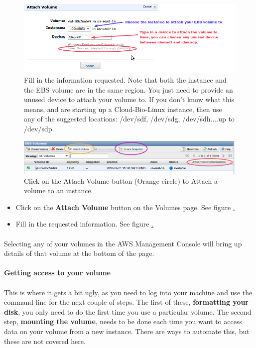 \begin{figure}[!hd]
\includegraphics[width=\maxwidth]{"images/attachVolume-2"}
\caption[Attaching a volume]{\label{fig:attachvolume1}Fill in the information requested. Note that both the instance and the EBS volume are in the same region. You just need to provide an unused device to attach your volume to. If you don't know what this means, and are starting up a Cloud-Bio-Linux instance, then use any of the suggested locations: /dev/sdf, /dev/sdg, /dev/sdh....up to /dev/sdp.}
\end{figure}

\begin{figure}[!hd]
\includegraphics[width=\maxwidth]{"images/attachVolume-1"}
\caption[Attaching a volume]{\label{fig:attachvolume1}Click on the Attach Volume button (Orange circle) to Attach a volume to an instance.}
\end{figure}

\begin{itemize}
\item Click on the \textbf{Attach Volume} button on the Volumes page. See figure \href{fig:attachvolume1}. 
\item Fill in the requested information. See figure \href{fig:attachvolume2}.
\end{itemize}
\paragraph{}Selecting any of your volumes in the AWS Management Console will bring up details of that volume at the bottom of the page. 


\paragraph{Getting access to  your volume}
\paragraph{}This is where it gets a bit ugly, as you need to log into your machine and use the command line for the next couple of steps. The first of these, \textbf{formatting your disk}, you only need to do the first time you use a particular volume. The second step, \textbf{mounting the volume}, needs to be done each time you want to access data on your volume from a new instance. There are ways to automate this, but these are not covered here. 

